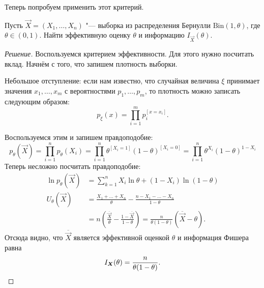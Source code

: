 Теперь попробуем применить этот критерий.
\begin{problem}
	Пусть $\vec{X} = (X_{1}, \ldots, X_{n})$ "--- выборка из распределения Бернулли $\mathrm{Bin}(1, \theta)$, где $\theta \in (0, 1)$. Найти эффективную оценку $\theta$ и информацию $I_{\vec{X}}(\theta)$.
\end{problem}
\begin{proof}[Решение]
	Воспользуемся критерием эффективности. Для этого нужно посчитать вклад. Начнём с того, что запишем плотность выборки.
	
	Небольшое отступление: если нам известно, что случайная величина $\xi$ принимает значения $x_{1}, \ldots, x_{m}$ с вероятностями $p_{1}, \ldots, p_{m}$, то плотность можно записать следующим образом:
	\[
		p_{\xi}(x) = \prod_{i = 1}^{m} p_{i}^{[x = x_{i}]}.
	\]
	
	Воспользуемся этим и запишем правдоподобие:
	\[
		p_{\theta}(\vec{X}) 
		= \prod_{i = 1}^{n} p_{\theta}(X_{i}) 
		= \prod_{i = 1}^{n} \theta^{[X_{i} = 1]}(1 - \theta)^{[X_{i} = 0]}
		= \prod_{i = 1}^{n} \theta^{X_{i}}(1 - \theta)^{1 - X_{i}}
	\]
	Теперь несложно посчитать правдоподобие:
	\begin{align*}
		\ln p_{\theta}(\vec{X})
		&= \sum_{k = 1}^{n} X_{i}\ln\theta + (1 - X_{i})\ln(1 - \theta) \\
		U_{\theta}(\vec{X})
		&= \frac{X_{1} + \ldots + X_{n}}{\theta} - \frac{n - X_{1} - \ldots - X_{n}}{1 - \theta} \\
		&= n\left(\frac{\overline{\vec{X}}}{\theta} - \frac{1 - \overline{\vec{X}}}{1 - \theta}\right) 
		= \frac{n}{\theta(1 - \theta)}(\overline{\vec{X}} - \theta).
	\end{align*}
	Отсюда видно, что $\overline{\vec{X}}$ является эффективной оценкой $\theta$ и информация Фишера равна
	\[
		I_{\vec{X}}(\theta) = \frac{n}{\theta(1 - \theta)}. \qedhere
	\]
\end{proof}

